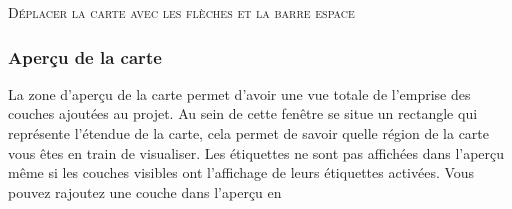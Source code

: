 
\begin{Tip}\caption{\textsc{Déplacer la carte avec les flèches et la barre espace}}
\end{Tip}

%
%

\subsubsection{Aperçu de la carte}\label{label_mapoverview}

La zone d'aperçu de la carte permet d'avoir une vue totale de l'emprise des couches ajoutées au projet. Au sein de cette fenêtre se situe un rectangle qui représente l'étendue de la carte, cela permet de savoir quelle région de la carte vous êtes en train de visualiser. Les étiquettes ne sont pas affichées dans l'aperçu même si les couches visibles ont l'affichage de leurs étiquettes activées.
Vous pouvez rajoutez une couche dans l'aperçu en

